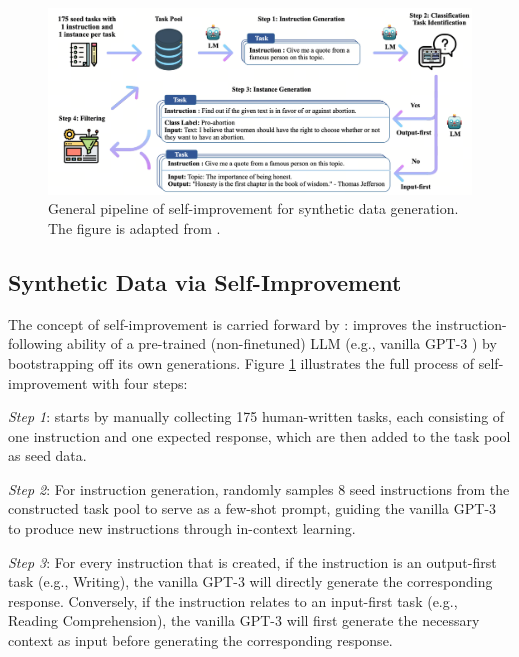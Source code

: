 \documentclass[11pt]{article}
\begin{document}
\begin{figure}
    \centering
    \includegraphics[width=0.95\linewidth]{figures/self_improvement_process.png}   
    \caption{General pipeline of self-improvement for synthetic data generation. The figure is adapted from \citet{wang2022self}.}
    \label{fig:self_improvement_process}
\end{figure}

\subsection{Synthetic Data via Self-Improvement}
\label{sub_section_self_improvment}

The concept of self-improvement is carried forward by \citet{wang2022self}: improves the instruction-following ability of a pre-trained (non-finetuned) LLM (e.g., vanilla GPT-3 \cite{Brown2020LanguageMA}) by bootstrapping off its own generations. Figure \ref{fig:self_improvement_process} illustrates the full process of self-improvement with four steps: 

\textit{Step 1}: \citet{wang2022self} starts by manually collecting 175 human-written tasks, each consisting of one instruction and one expected response, which are then added to the task pool as seed data.

\textit{Step 2}: For instruction generation, \citet{wang2022self} randomly samples 8 seed instructions from the constructed task pool to serve as a few-shot prompt, guiding the vanilla GPT-3 to produce new instructions through in-context learning.

\textit{Step 3}: For every instruction that is created, if the instruction is an output-first task (e.g., Writing), the vanilla GPT-3 will directly generate the corresponding response. Conversely, if the instruction relates to an input-first task (e.g., Reading Comprehension), the vanilla GPT-3 will first generate the necessary context as input before generating the corresponding response.
\end{document}
